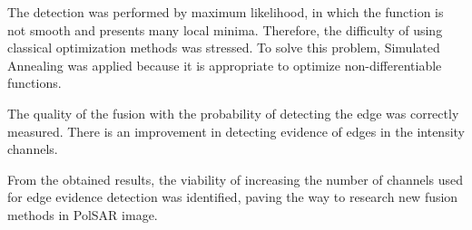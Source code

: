 \documentclass[conference]{IEEEtran}
\begin{document}
The detection was performed by maximum likelihood, in which the function is not smooth and presents many local minima.
Therefore, the difficulty of using classical optimization methods was stressed. 
To solve this problem, Simulated Annealing was applied because it is appropriate to optimize non-differentiable functions.

The quality of the fusion with the probability of detecting the edge was correctly measured. There is an improvement in detecting evidence of edges in the intensity channels.

From the obtained results, the viability of increasing the number of channels used for edge evidence detection was identified, paving the way to research new fusion methods in PolSAR image.



\end{document}
